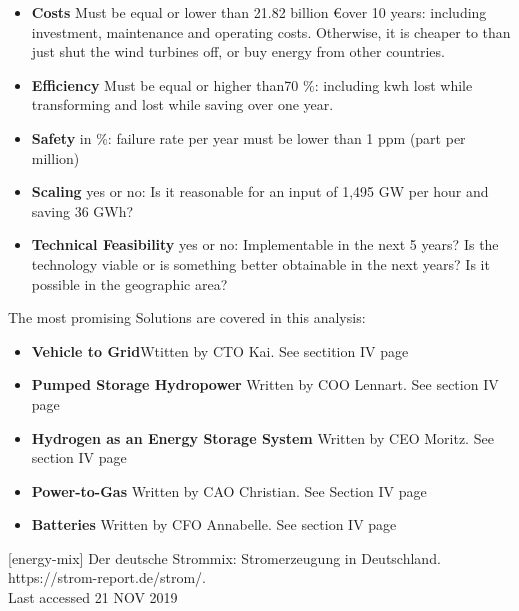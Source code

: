 \begin{parcolumns}[colwidths={1=2.5 cm, 2=10 cm, 3=2.5cm}]{3}
{\begin{itemize}
\item \textbf{Costs} Must be equal or lower than 21.82 billion \euro over 10 years: including investment, maintenance and operating costs. Otherwise, it is cheaper to than just shut the wind turbines off, or buy energy from other countries.
\item \textbf{Efficiency} Must be equal or higher than70 $\%$: including kwh lost while transforming and lost while saving over one year.
\item \textbf{Safety} in $\%$: failure rate per year must be lower than 1 ppm (part per million)
\item \textbf{Scaling} yes or no: Is it reasonable for an input of 1,495 GW per hour and saving 36 GWh? 
\item \textbf{Technical Feasibility} yes or no: Implementable in the next 5 years? Is the technology viable or is something better obtainable in the next years? Is it possible in the geographic area?  
\\
\end{itemize}
The most promising Solutions are covered in this analysis:
\begin{itemize}
\item \textbf{Vehicle to Grid}\newline Wtitten by CTO Kai. See sectition IV page \pageref{V2G_Kai}
\item \textbf{Pumped Storage Hydropower} \newline Written by COO Lennart. See section IV page \pageref{PumpedStorageHydropower_Lennart}
\item \textbf{Hydrogen as an Energy Storage System} \newline Written by CEO Moritz. See section IV page \pageref{H2_Moritz}
\item \textbf{Power-to-Gas} \newline Written by CAO Christian. See Section IV page \pageref{PowertoGas_Christian}
\item \textbf{Batteries} \newline Written by CFO Annabelle. See section IV page \pageref{Batteries}
\\
\end{itemize}
[energy-mix]  Der deutsche Strommix: Stromerzeugung in Deutschland. \\https://strom-report.de/strom/.\\Last accessed 21 NOV 2019


}


\end{parcolumns}
